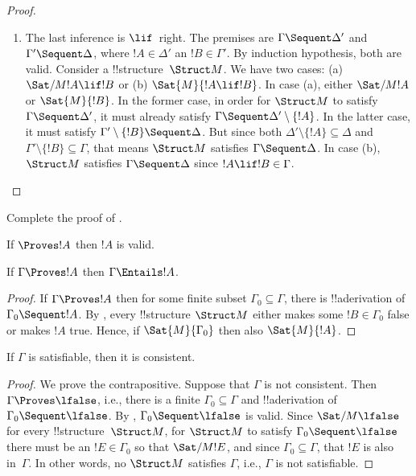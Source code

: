 \documentclass[../../include/open-logic-section]{subfiles}
\begin{document}
\begin{proof}
\begin{enumerate}
\item The last inference is $\lif$~right. The premises are $\Gamma
  \Sequent \Delta'$ and $\Gamma' \Sequent \Delta$, where $!A \in
  \Delta'$ an $!B \in \Gamma'$.  By induction hypothesis, both are
  valid.  Consider a !!{structure}~$\Struct M$.  We have two cases:
  (a) $\Sat/{M}{!A \lif !B}$ or (b) $\Sat{M}{!A \lif !B}$. In case
  (a), either $\Sat/{M}{!A}$ or $\Sat{M}{!B}$.  In the former case, in
  order for $\Struct M$ to satisfy $\Gamma \Sequent \Delta'$, it must
  already satisfy $\Gamma \Sequent \Delta' \setminus \{!A\}$.  In the
  latter case, it must satisfy $\Gamma' \setminus \{!B\} \Sequent
  \Delta$.  But since both $\Delta' \setminus \{!A\} \subseteq \Delta$
  and $\Gamma' \setminus \{!B\} \subseteq \Gamma$, that means $\Struct
  M$ satisfies $\Gamma \Sequent \Delta$.  In case (b), $\Struct M$
  satisfies $\Gamma \Sequent \Delta$ since $!A \lif !B \in \Gamma$.
\end{enumerate}
\end{proof}

\begin{prob}
Complete the proof of .
\end{prob}

\begin{cor}
If $\Proves !A$ then $!A$ is valid.
\end{cor}

\begin{cor}
If $\Gamma \Proves !A$ then $\Gamma \Entails !A$.
\end{cor}

\begin{proof}
If $\Gamma \Proves !A$ then for some finite subset $\Gamma_0 \subseteq
\Gamma$, there is !!a{derivation} of $\Gamma_0 \Sequent !A$. By
, every !!{structure} $\Struct M$ either
makes some $!B \in \Gamma_0$ false or makes $!A$ true.  Hence, if
$\Sat{M}{\Gamma_0}$ then also $\Sat{M}{!A}$.
\end{proof}

\begin{cor}
If $\Gamma$ is satisfiable, then it is consistent.
\end{cor}

\begin{proof}
We prove the contrapositive. Suppose that $\Gamma$ is not
consistent. Then $\Gamma \Proves \lfalse$, i.e., there is a finite
$\Gamma_0 \subseteq \Gamma$ and !!a{derivation} of $\Gamma_0 \Sequent
\lfalse$. By , $\Gamma_0 \Sequent \lfalse$ is
valid.  Since $\Sat/{M}{\lfalse}$ for every !!{structure}~$\Struct M$,
for $\Struct M$ to satisfy $\Gamma_0 \Sequent \lfalse$ there must be
an $!E \in \Gamma_0$ so that $\Sat/{M}{!E}$, and since $\Gamma_0
\subseteq \Gamma$, that $!E$ is also in~$\Gamma$.  In other words, no
$\Struct M$ satisfies $\Gamma$, i.e., $\Gamma$ is not satisfiable.
\end{proof}
\end{document}
